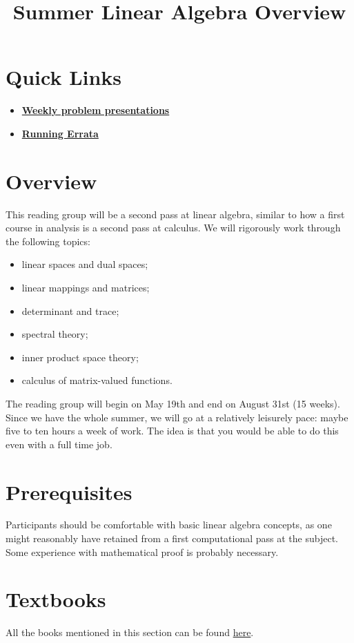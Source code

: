 \documentclass{article}
\title{Summer Linear Algebra Overview}
\begin{document}
\maketitle

\section{Quick Links}
\begin{itemize}
  \item \href{https://www.overleaf.com/8251467867kkqxyvzcmndp#f019d2}{\textbf{Weekly problem presentations}}
  \item \href{https://www.overleaf.com/7498622626cjfdwmgbbcjq#7b94e3}{\textbf{Running Errata}}
\end{itemize}

\section{Overview}
This reading group will be a second pass at linear algebra, similar to how a first course in analysis is a second pass at calculus. We will rigorously work through the following topics:
\begin{itemize}
    \item linear spaces and dual spaces;
    \item linear mappings and matrices;
    \item determinant and trace;
    \item spectral theory;
    \item inner product space theory;
    \item calculus of matrix-valued functions.
\end{itemize}

The reading group will begin on May 19th and end on August 31st (15 weeks). Since we have the whole summer, we will go at a relatively leisurely pace: maybe five to ten hours a week of work. The idea is that you would be able to do this even with a full time job.

\section{Prerequisites}
Participants should be comfortable with basic linear algebra concepts, as one might reasonably have retained from a first computational pass at the subject. Some experience with mathematical proof is probably necessary.

\section{Textbooks}
All the books mentioned in this section can be found \href{https://drive.google.com/drive/folders/1chb49hv65hB8ZXcne0Ljfh3viO_SdOmW?usp=drive_link}{here}.
\end{document}
